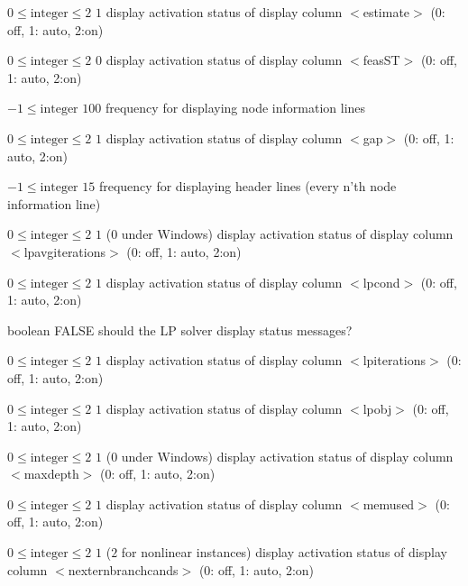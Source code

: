 %
{$0\leq\textrm{integer}\leq2$}%
{$1$}%
{display activation status of display column $<$estimate$>$ (0: off, 1: auto, 2:on)}%
{}

%
{$0\leq\textrm{integer}\leq2$}%
{$0$}%
{display activation status of display column $<$feasST$>$ (0: off, 1: auto, 2:on)}%
{}

%
{$-1\leq\textrm{integer}$}%
{$100$}%
{frequency for displaying node information lines}%
{}

%
{$0\leq\textrm{integer}\leq2$}%
{$1$}%
{display activation status of display column $<$gap$>$ (0: off, 1: auto, 2:on)}%
{}

%
{$-1\leq\textrm{integer}$}%
{$15$}%
{frequency for displaying header lines (every n'th node information line)}%
{}

%
{$0\leq\textrm{integer}\leq2$}%
{$1$ ($0$ under Windows)}%
{display activation status of display column $<$lpavgiterations$>$ (0: off, 1: auto, 2:on)}%
{}

%
{$0\leq\textrm{integer}\leq2$}%
{$1$}%
{display activation status of display column $<$lpcond$>$ (0: off, 1: auto, 2:on)}%
{}

%
{boolean}%
{FALSE}%
{should the LP solver display status messages?}%
{}

%
{$0\leq\textrm{integer}\leq2$}%
{$1$}%
{display activation status of display column $<$lpiterations$>$ (0: off, 1: auto, 2:on)}%
{}

%
{$0\leq\textrm{integer}\leq2$}%
{$1$}%
{display activation status of display column $<$lpobj$>$ (0: off, 1: auto, 2:on)}%
{}

%
{$0\leq\textrm{integer}\leq2$}%
{$1$ ($0$ under Windows)}%
{display activation status of display column $<$maxdepth$>$ (0: off, 1: auto, 2:on)}%
{}

%
{$0\leq\textrm{integer}\leq2$}%
{$1$}%
{display activation status of display column $<$memused$>$ (0: off, 1: auto, 2:on)}%
{}

%
{$0\leq\textrm{integer}\leq2$}%
{$1$ ($2$ for nonlinear instances)}%
{display activation status of display column $<$nexternbranchcands$>$ (0: off, 1: auto, 2:on)}%
{}

